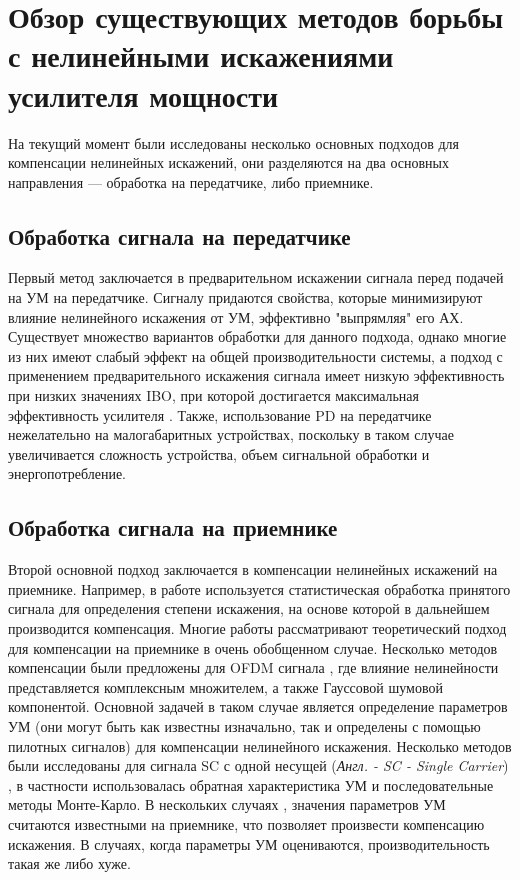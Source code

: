 \documentclass{unn}
\begin{document}
\section{Обзор существующих методов борьбы с нелинейными искажениями усилителя мощности}
На текущий момент были исследованы несколько основных подходов для
компенсации нелинейных искажений, они разделяются на два основных
направления — обработка на передатчике, либо приемнике.

\subsection{Обработка сигнала на передатчике}

Первый метод заключается в предварительном искажении сигнала перед
подачей на УМ на передатчике. Сигналу придаются свойства, которые
минимизируют влияние нелинейного искажения от УМ, эффективно "выпрямляя"
его АХ. Существует множество вариантов обработки для данного подхода,
однако многие из них имеют слабый эффект на общей производительности
системы, а подход с применением предварительного искажения сигнала имеет
низкую эффективность при низких значениях IBO, при которой достигается
максимальная эффективность усилителя \cite{sharath2015}
\cite{shabany2008} \cite{eda2001}. Также, использование PD на передатчике
нежелательно на малогабаритных устройствах, поскольку в таком случае
увеличивается сложность устройства, объем сигнальной обработки и энергопотребление.

\subsection{Обработка сигнала на приемнике}

Второй основной подход заключается в компенсации нелинейных искажений на
приемнике. Например, в работе \cite{maltsev2021} используется
статистическая обработка принятого сигнала для определения степени
искажения, на основе которой в дальнейшем производится компенсация. Многие
работы \cite[]{sharath2015, shabany2008,bhat2016,qi2010,gregorio2007,
bouhadda2015,drotar2010} рассматривают теоретический подход для компенсации
на приемнике в очень обобщенном случае. Несколько методов компенсации были
предложены для OFDM сигнала \cite[]{gregorio2007,bouhadda2015, drotar2010},
где влияние нелинейности представляется комплексным множителем, а также
Гауссовой шумовой компонентой. Основной задачей в таком случае является
определение параметров УМ (они могут быть как известны изначально, так и
определены с помощью пилотных сигналов) для компенсации нелинейного
искажения. Несколько методов были исследованы для сигнала SC с одной несущей
(\textit{Англ. - SC - Single Carrier}) \cite[]{sharath2015,
shabany2008,bhat2016, qi2010}, в частности использовалась обратная
характеристика УМ и последовательные методы Монте-Карло. В нескольких
случаях \cite[]{bhat2016, qi2010,gregorio2007}, значения параметров УМ
считаются известными на приемнике, что позволяет произвести компенсацию
искажения. В случаях, когда параметры УМ оцениваются, производительность
такая же либо хуже.
\end{document}
